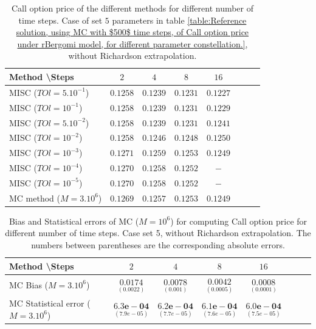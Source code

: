 \documentclass[11pt]{article}
\begin{document}
\begin{table}[h!]
	\centering
	\begin{tabular}{l*{6}{c}r}
		Method \textbackslash  Steps            & $2$ & $4$ & $8$ & $16$ &   \\
		\hline
		MISC ($TOl=5.10^{-1}$)  & $0.1258$ & $0.1239$ & $0.1231$ & $0.1227$  \\
		MISC ($TOl=10^{-1}$)  & $0.1258$ & $0.1239$ & $0.1231$ & $0.1229$  \\
		MISC ($TOl=5.10^{-2}$)  & $0.1258$ & $0.1239$ & $0.1231$ & $0.1241$  \\
		MISC ($TOl=10^{-2}$)  & $0.1258$ & $0.1246$ & $0.1248$ & $0.1250$  \\
		MISC ($TOl=10^{-3}$)  & $0.1271$ & $0.1259$ & $0.1253$ & $0.1249$  \\
		MISC ($TOl=10^{-4}$)  & $0.1270$ & $0.1258$ & $0.1252$ & $-$  \\
		
			MISC ($TOl=10^{-5}$)  & $0.1270$ &$0.1258$ &  $0.1252$ & $-$  \\
		\hline
		MC method ($M=3.10^{6}$)   & $    0.1269$ & $0.1257$  & $0.1253$ & $0.1249$ \\		
		
		\hline
	\end{tabular}
	\caption{ Call option price of the different methods for different number of time steps. Case of set $5$ parameters in table \ref{table:Reference solution, using MC with $500$ time steps, of Call option price under rBergomi model, for different parameter constellation.}, without Richardson extrapolation.}
	\label{table: Call option price of the different methods for different number of time steps. Case set 5}
\end{table}


\begin{table}[h!]
	\centering
	\begin{tabular}{l*{6}{c}r}
		Method \textbackslash  Steps            & $2$ & $4$ & $8$ & $16$  \\
		\hline
		MC Bias ($M=3.10^6$)   & 	$ \underset{(    0.0022)}{\mathbf{0.0174}}$  & $\underset{(0.001)}{\mathbf{0.0078}}$  & $\underset{(0.0005)}{\mathbf{0.0042}}$ & $\underset{(0.0001)}{\mathbf{0.0008}}$\\ 
		
		MC Statistical error ($M=3.10^6$)  &  $\underset{(   7.9e-05)} {\mathbf{6.3e-04}}$  & $\underset{(7.7e-05)} {\mathbf{6.2e-04}}$  & $\underset{(7.6e-05)} {\mathbf{6.1e-04 }}$ & $\underset{(7.5e-05)} {\mathbf{6.0e-04}}$	\\
		
		\hline
	\end{tabular}
	\caption{Bias and Statistical errors of MC ($M=10^6$)  for computing Call option price  for different number of time steps. Case set 5, without Richardson extrapolation. The numbers between parentheses are the corresponding absolute errors.}
	\label{Bias and Statistical errors of MC ($M=10^6$)  for computing Call option price  for different number of time steps. Case set 5, without Richardson extrapolation. The numbers between parentheses are the corresponding absolute errors.}
\end{table}
\end{document}
